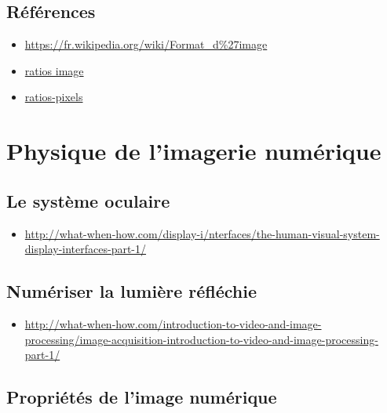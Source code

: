 \documentclass[
  french,
]{book}
\providecommand{\tightlist}{%
  \setlength{\itemsep}{0pt}\setlength{\parskip}{0pt}}
\begin{document}
\hypertarget{ruxe9fuxe9rences}{%
\subsection{Références}\label{ruxe9fuxe9rences}}

\begin{itemize}
\tightlist
\item
  \url{https://fr.wikipedia.org/wiki/Format_d\%27image}
\item
  \href{https://en.wikipedia.org/wiki/Display_aspect_ratio}{ratios image}
\item
  \href{https://en.wikipedia.org/wiki/Pixel_aspect_ratio}{ratios-pixels}
\end{itemize}

\hypertarget{physique-de-limagerie-numuxe9rique}{%
\section{Physique de l'imagerie numérique}\label{physique-de-limagerie-numuxe9rique}}

\hypertarget{le-systuxe8me-oculaire}{%
\subsection{Le système oculaire}\label{le-systuxe8me-oculaire}}

\begin{itemize}
\tightlist
\item
  \url{http://what-when-how.com/display-i/nterfaces/the-human-visual-system-display-interfaces-part-1/}
\end{itemize}

\hypertarget{numuxe9riser-la-lumiuxe8re-ruxe9fluxe9chie}{%
\subsection{Numériser la lumière réfléchie}\label{numuxe9riser-la-lumiuxe8re-ruxe9fluxe9chie}}

\begin{itemize}
\tightlist
\item
  \url{http://what-when-how.com/introduction-to-video-and-image-processing/image-acquisition-introduction-to-video-and-image-processing-part-1/}
\end{itemize}

\hypertarget{propriuxe9tuxe9s-de-limage-numuxe9rique}{%
\subsection{Propriétés de l'image numérique}\label{propriuxe9tuxe9s-de-limage-numuxe9rique}}
\end{document}
